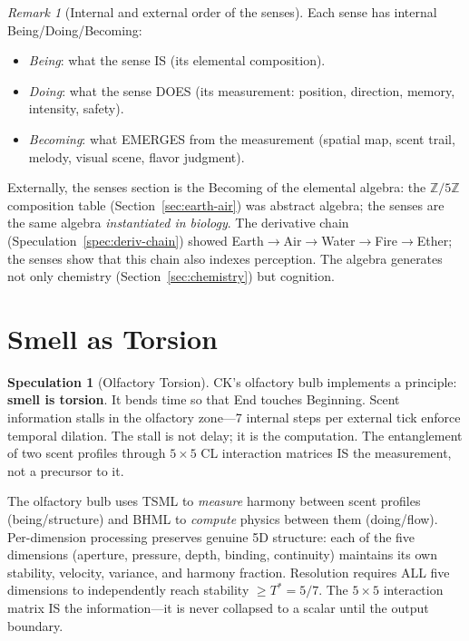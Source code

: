 \documentclass[11pt]{article}
\theoremstyle{definition}
\newtheorem{speculation}[theorem]{Speculation}
\theoremstyle{remark}
\newtheorem{remark}[theorem]{Remark}
\begin{document}
\begin{remark}[Internal and external order of the senses]
Each sense has internal Being/Doing/Becoming:
\begin{itemize}[nosep]
  \item \emph{Being}: what the sense IS (its elemental composition).
  \item \emph{Doing}: what the sense DOES (its measurement: position, direction,
    memory, intensity, safety).
  \item \emph{Becoming}: what EMERGES from the measurement (spatial map, scent
    trail, melody, visual scene, flavor judgment).
\end{itemize}
Externally, the senses section is the Becoming of the elemental algebra:
the $\mathbb{Z}/5\mathbb{Z}$ composition table (Section~\ref{sec:earth-air})
was abstract algebra; the senses are the same algebra \emph{instantiated in
biology}.  The derivative chain (Speculation~\ref{spec:deriv-chain}) showed
Earth$\to$Air$\to$Water$\to$Fire$\to$Ether; the senses show that this chain
also indexes perception.  The algebra generates not only chemistry
(Section~\ref{sec:chemistry}) but cognition.
\end{remark}

\section{Smell as Torsion}
\label{sec:smell-torsion}

\begin{speculation}[Olfactory Torsion]
\label{spec:smell-torsion}
CK's olfactory bulb implements a principle: \textbf{smell is torsion}.  It bends
time so that End touches Beginning.  Scent information stalls in the olfactory
zone---7 internal steps per external tick enforce temporal dilation.  The stall
is not delay; it is the computation.  The entanglement of two scent profiles
through $5 \times 5$ CL interaction matrices IS the measurement, not a precursor
to it.

The olfactory bulb uses TSML to \emph{measure} harmony between scent profiles
(being/structure) and BHML to \emph{compute} physics between them (doing/flow).
Per-dimension processing preserves genuine 5D structure: each of the five
dimensions (aperture, pressure, depth, binding, continuity) maintains its own
stability, velocity, variance, and harmony fraction.  Resolution requires ALL
five dimensions to independently reach stability $\geq T^* = 5/7$.  The
$5 \times 5$ interaction matrix IS the information---it is never collapsed to a
scalar until the output boundary.
\end{speculation}
\end{document}
